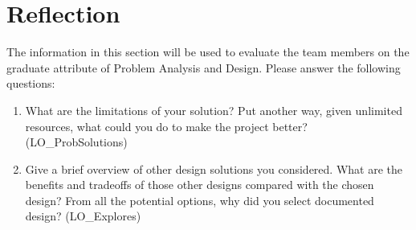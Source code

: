 \documentclass[12pt, titlepage]{article}
\begin{document}
\section{Reflection}

The information in this section will be used to evaluate the team members on the
graduate attribute of Problem Analysis and Design.  Please answer the following questions:

\begin{enumerate}
  \item What are the limitations of your solution?  Put another way, given
  unlimited resources, what could you do to make the project better? (LO\_ProbSolutions)
  \item Give a brief overview of other design solutions you considered.  What
  are the benefits and tradeoffs of those other designs compared with the chosen
  design?  From all the potential options, why did you select documented design?
  (LO\_Explores)
\end{enumerate}
\end{document}
